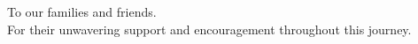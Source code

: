 \begin{dedication}
{\large{To our families and friends.}}\\[5mm]
For their unwavering support and encouragement throughout this journey.
\end{dedication}
